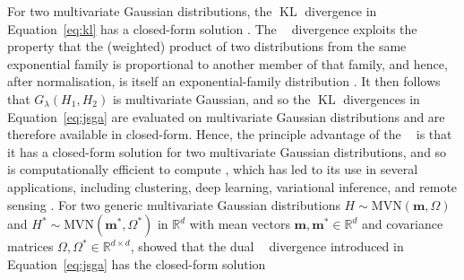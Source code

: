 \documentclass[12pt]{article}
\DeclareMathOperator{\KL}{\mathrm{KL}}
\newcommand{\JSGa}{\mathop{\mathrm{JS}^{\mathrm{G}_{\lambda}}}\nolimits}
\begin{document}
For two multivariate Gaussian distributions, the $\KL{}$ divergence in Equation~\eqref{eq:kl} has a closed-form solution \citep{Duchi2007}.
The $\JSGa{}$ divergence exploits the property that the (weighted) product of two distributions from the same exponential family is proportional to another member of that family, and hence, after normalisation, is itself an exponential-family distribution \citep{Nielsen2019}.
It then follows that $G_{\lambda}(H_1, H_2)$ is multivariate Gaussian, and so the $\KL{}$ divergences in Equation~\eqref{eq:jsga} are evaluated on multivariate Gaussian distributions and are therefore available in closed-form.
Hence, the principle advantage of the $\JSGa{}$ is that it has a closed-form solution for two multivariate Gaussian distributions, and so is computationally efficient to compute \citep{Nielsen2019}, which has led to its use in several applications, including clustering, deep learning, variational inference, and remote sensing \citep{Nielsen2019, Deasy2020, Ni2023-cd, Thiagarajan2025}.
For two generic multivariate Gaussian distributions $H \sim \mbox{MVN}(\symbf{m}, \Omega)$ and $H^* \sim \mbox{MVN}(\symbf{m}^*, \Omega^*)$ in $\mathbb{R}^d$ with mean vectors $\symbf{m}, \symbf{m}^* \in \mathbb{R}^d$ and covariance matrices $\Omega, \Omega^* \in \mathbb{R}^{d \times d}$, \citet{Nielsen2019} showed that the dual $\JSGa{}$ divergence introduced in Equation~\eqref{eq:jsga} has the closed-form solution 
\end{document}

